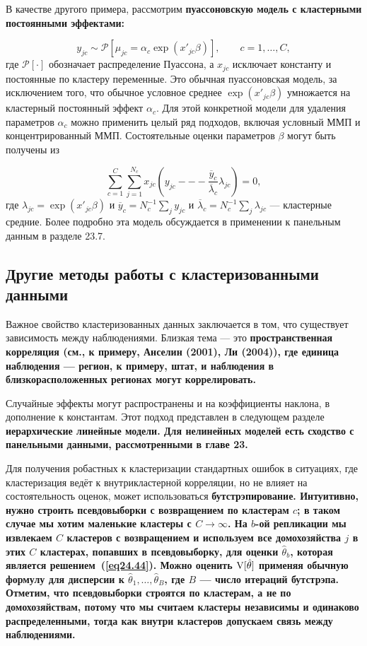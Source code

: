 В качестве другого примера, рассмотрим \bfseries пуассоновскую модель с кластерными постоянными эффектами: \mdseries

$$
y_{jc} \sim \mathcal P [\mu_{jc} = \alpha_c \exp(x'_{jc} \beta)], \qquad c=1, \dots, C, 
$$
где $\mathcal P[\cdot]$ обозначает распределение Пуассона, а $x_{jc}$ исключает константу и постоянные по кластеру переменные. Это обычная пуассоновская модель, за исключением того, что обычное условное среднее $\exp(x'_{jc} \beta)$ умножается на кластерный постоянный эффект $\alpha_c$. Для этой конкретной модели для удаления параметров $\alpha_c$ можно применить целый ряд подходов, включая условный ММП и концентрированный ММП. Состоятельные оценки параметров $\beta$ могут быть получены из 

$$
\sum_{c=1}^C \sum_{j=1}^{N_c} x_{jc} \left( y_{jc} --- \frac{\overline{y}_c}{\overline{\lambda}_c} \lambda_{jc} \right) =0,
$$
где $\lambda_{jc} = \exp(x'_{jc}\beta)$ и $\overline{y}_c = N_c^{-1} \sum_j y_{jc}$ и $\overline{\lambda}_c = N_c^{-1} \sum_j \lambda_{jc}$ --- кластерные средние. Более подробно эта модель обсуждается в применении к панельным данным в разделе 23.7. 

\subsection{Другие методы работы с кластеризованными данными}

Важное свойство кластеризованных данных заключается в том, что существует зависимость между наблюдениями. Близкая тема --- это \bfseries пространственная корреляция \mdseries (см., к примеру, Анселин (2001), Ли (2004)), где единица наблюдения --- регион, к примеру, штат, и наблюдения в близкорасположенных регионах могут коррелировать. 

Случайные эффекты могут распространены и на коэффициенты наклона, в дополнение к константам. Этот подход представлен в следующем разделе \bfseries иерархические линейные модели\mdseries. Для нелинейных моделей есть сходство с панельными данными, рассмотренными в главе 23. 

Для получения робастных к кластеризации стандартных ошибок в ситуациях, где кластеризация ведёт к внутрикластерной корреляции, но не влияет на состоятельность оценок, может использоваться \bfseries бутстрэпирование. \mdseries Интуитивно, нужно строить псевдовыборки с возвращением по кластерам $c$; в таком случае мы хотим маленькие кластеры с $C \to \infty$. На $b$-ой репликации мы извлекаем $C$ кластеров с возвращением и используем все домохозяйства $j$ в этих $C$ кластерах, попавших в псевдовыборку, для оценки $\hat \theta_b$, которая является решением~(\ref{eq24.44}). Можно оценить $\mathrm{V}[\hat \theta]$ применяя обычную формулу для дисперсии к $\hat \theta_1, \dots, \hat \theta_B$, где $B$ --- число итераций бутстрэпа. Отметим, что псевдовыборки строятся по кластерам, а не по домохозяйствам, потому что мы считаем кластеры независимы и одинаково распределенными, тогда как внутри кластеров допускаем связь между наблюдениями. 

